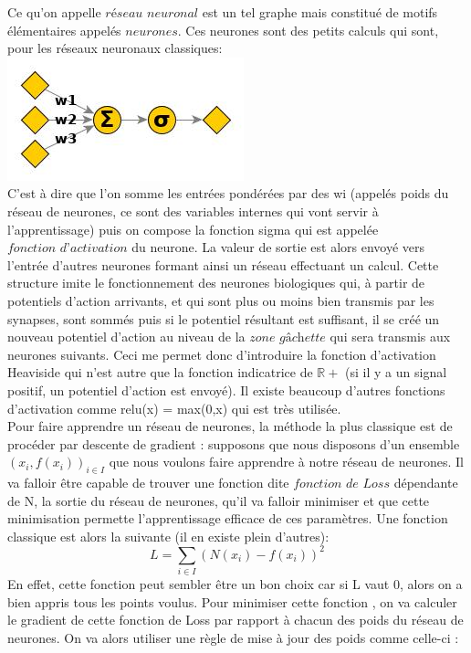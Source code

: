 \documentclass[10pt]{article}
\begin{document}
Ce qu'on appelle $\textit{réseau neuronal}$ est un tel graphe mais constitué de motifs élémentaires appelés $\textit{neurones}$. Ces neurones sont des petits calculs qui sont, pour les réseaux neuronaux classiques:\\
\indent\indent\indent\indent\indent\indent\indent\indent\indent\indent\includegraphics[scale=0.45]{ex_art_neuron.jpg}\\
C'est à dire que l'on somme les entrées pondérées par des wi (appelés poids du réseau de neurones, ce sont des variables internes qui vont servir à l'apprentissage) puis on compose la fonction sigma qui est appelée $\textit{fonction d'activation}$ du neurone. La valeur de sortie est alors envoyé vers l'entrée d'autres neurones formant ainsi un réseau effectuant un calcul. Cette structure imite le fonctionnement des neurones biologiques qui, à partir de potentiels d'action arrivants, et qui sont plus ou moins bien transmis par les synapses, sont sommés puis si le potentiel résultant est suffisant, il se créé un nouveau potentiel d'action au niveau de la $\textit{zone gâchette}$ qui sera transmis aux neurones suivants. Ceci me permet donc d'introduire la fonction d'activation Heaviside qui n'est autre que la fonction indicatrice de $\mathbb{R+}$ (si il y a un signal positif, un potentiel d'action est envoyé). Il existe beaucoup d'autres fonctions d'activation comme relu(x) = max(0,x) qui est très utilisée.\\
Pour faire apprendre un réseau de neurones, la méthode la plus classique est de procéder par descente de gradient : supposons que nous disposons d'un ensemble $(x_i,f(x_i))_{i\in I}$  que nous voulons faire apprendre à notre réseau de neurones. Il va falloir être capable de trouver une fonction dite $\textit{fonction de Loss}$ dépendante de N, la sortie du réseau de neurones, qu'il va falloir minimiser et que cette minimisation permette l'apprentissage efficace de ces paramètres. Une fonction classique est alors la suivante (il en existe plein d'autres):
\[L = \sum_{i\in I}(N(x_i) - f(x_i))^2\]
En effet, cette fonction peut sembler être un bon choix car si L vaut 0, alors on a bien appris tous les points voulus. Pour minimiser cette fonction , on va calculer le gradient de cette fonction de Loss par rapport à chacun des poids du réseau de neurones. On va alors utiliser une règle de mise à jour des poids comme celle-ci : 
\end{document}
